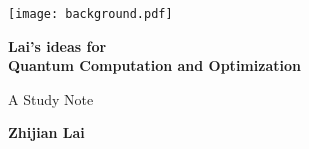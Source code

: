 \documentclass[
        11pt, %
	a4paper, %
]{LegrandOrangeBook}
\begin{document}

\titlepage %
	{\texttt{[image: background.pdf]}} %
	{ %
		\centering\sffamily %
		{\Huge\bfseries
            Lai's ideas for \\
            Quantum Computation and Optimization
            \par} %
		\vspace{16pt} %
		{\LARGE A Study Note\par} %
		\vspace{24pt} %
		{\huge\bfseries
            Zhijian Lai
            \par} %
	}







\end{document}
